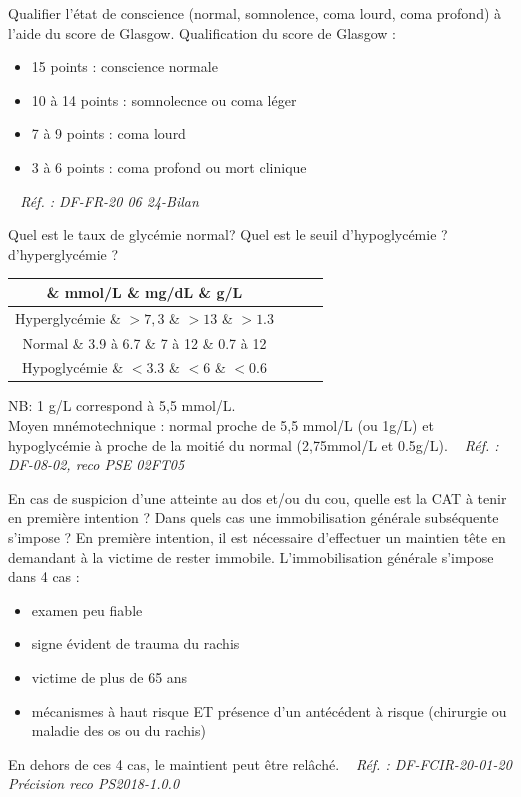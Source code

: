 \documentclass[grid,avery5371,landscape]{flashcards}
\makeatletter
\newcounter{nocarte}
\newcommand{\categ}[1]{%
  \def\@categ{#1}%
  \setcounter{nocarte}{0}%
}
\newcommand{\source}[1]{%
  \medskip
  \itshape%
   ~ \hfill Réf. : #1}
\makeatother
\begin{document}
\color[HTML]{003273}
\categ{PSE}
\begin{flashcard}[bilan]{
 Qualifier l'état de conscience (normal, somnolence, coma lourd, coma profond) à l'aide du score de Glasgow.   }
  Qualification du score de Glasgow : 
\begin{itemize} 
\item 15 points : conscience normale
\item 10 à 14 points : somnolecnce ou coma léger
\item 7 à 9 points : coma lourd
\item 3 à 6 points : coma profond ou mort clinique
\end{itemize}
  \source{DF-FR-20 06 24-Bilan}
\end{flashcard}


\color[HTML]{003273}
\categ{PSE}
\begin{flashcard}[bilan]{
 Quel est le taux de glycémie normal? Quel est le seuil d'hypoglycémie ? d'hyperglycémie ?   }
  \begin{tabular}{c|ccc}
                        \& mmol/L    \& mg/dL  \& g/L    \\ \hline
        Hyperglycémie   \& $>7,3$      \& $>13$    \& $>1.3$ \\
        Normal          \& 3.9 à 6.7 \& 7 à 12  \& 0.7 à 12 \\
        Hypoglycémie    \& $<3.3$      \& $<6$      \& $<0.6$
    \end{tabular}
NB: 1 g/L correspond à 5,5 mmol/L. \\ Moyen mnémotechnique : normal proche de 5,5 mmol/L (ou 1g/L) et hypoglycémie à proche de la moitié du normal (2,75mmol/L et 0.5g/L).
  \source{DF-08-02, reco PSE 02FT05}
\end{flashcard}


\color[HTML]{003273}
\categ{PSE}
\begin{flashcard}[CAT]{
 En cas de suspicion d'une atteinte au dos et/ou du cou, quelle est la CAT à tenir en première intention ?
Dans quels cas une immobilisation générale subséquente s'impose ?   }
  En première intention, il est nécessaire d'effectuer un maintien tête en demandant à la victime de rester immobile. L'immobilisation générale s'impose dans 4 cas :
   \begin{itemize}
       \item examen peu fiable
       \item signe évident de trauma du rachis
       \item victime de plus de 65 ans
       \item mécanismes à haut risque ET présence d'un antécédent à risque (chirurgie ou maladie des os ou du rachis)
   \end{itemize}
En dehors de ces 4 cas, le maintient peut être relâché.
  \source{DF-FCIR-20-01-20 Précision reco PS2018-1.0.0}
\end{flashcard}
\end{document}
